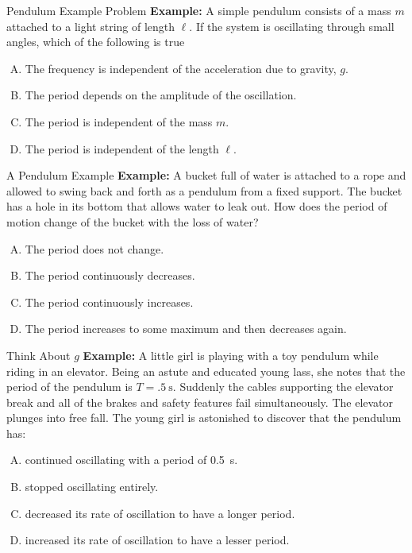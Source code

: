 \documentclass[12pt,compress,aspectratio=169]{beamer}
\begin{document}
\begin{frame}{Pendulum Example Problem}
  \textbf{Example:} A simple pendulum consists of a mass $m$ attached to a
  light string of length $\ell$. If the system is oscillating through small
  angles, which of the following is true
  \begin{enumerate}[(A)]
  \item The frequency is independent of the acceleration due to gravity, $g$.
  \item The period depends on the amplitude of the oscillation.
  \item The period is independent of the mass $m$.
  \item The period is independent of the length $\ell$.
  \end{enumerate}
\end{frame}



\begin{frame}{A Pendulum Example}
  \textbf{Example:} A bucket full of water is attached to a rope and allowed
  to swing back and forth as a pendulum from a fixed support. The bucket has a
  hole in its bottom that allows water to leak out. How does the period of
  motion change of the bucket with the loss of water?
  \begin{enumerate}[(A)]
  \item The period does not change.
  \item The period continuously decreases.
  \item The period continuously increases.
  \item The period increases to some maximum and then decreases again.
  \end{enumerate}
\end{frame}



\begin{frame}{Think About $g$}
  \textbf{Example:} A little girl is playing with a toy pendulum while riding
  in an elevator. Being an astute and educated young lass, she notes that the 
  period of the pendulum is $T=\SI{.5}\second$. Suddenly the cables
  supporting the elevator break and all  of the brakes and safety features fail
  simultaneously. The elevator plunges into free fall. The young girl is
  astonished to discover that the pendulum has:
  \begin{enumerate}[(A)]
  \item continued oscillating with a period of \SI{.5}\second.
  \item stopped oscillating entirely.
  \item decreased its rate of oscillation to have a longer period.
  \item increased its rate of oscillation to have a lesser period.
  \end{enumerate}
\end{frame}
\end{document}
